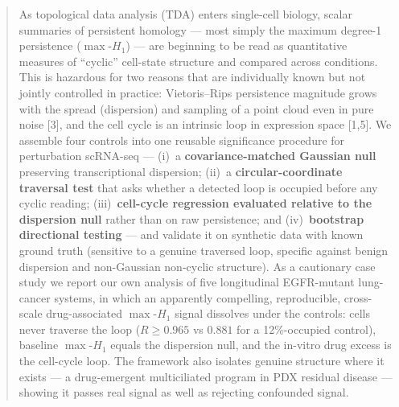 \documentclass[11pt,a4paper]{article}
\newcommand{\maxh}{\ensuremath{\max\text{-}H_1}}
\begin{document}
\begin{abstract}
\noindent As topological data analysis (TDA) enters single-cell biology, scalar summaries of
persistent homology --- most simply the maximum degree-1 persistence (\maxh) --- are beginning to
be read as quantitative measures of ``cyclic'' cell-state structure and compared across conditions.
This is hazardous for two reasons that are individually known but not jointly controlled in
practice: Vietoris--Rips persistence magnitude grows with the spread (dispersion) and sampling of a
point cloud even in pure noise [3], and the cell cycle is an intrinsic loop in expression space
[1,5]. We assemble four controls into one reusable significance procedure for perturbation
scRNA-seq --- (i)~a \textbf{covariance-matched Gaussian null} preserving transcriptional
dispersion; (ii)~a \textbf{circular-coordinate traversal test} that asks whether a detected loop is
occupied before any cyclic reading; (iii)~\textbf{cell-cycle regression evaluated relative to the
dispersion null} rather than on raw persistence; and (iv)~\textbf{bootstrap directional testing}
--- and validate it on synthetic data with known ground truth (sensitive to a genuine traversed
loop, specific against benign dispersion and non-Gaussian non-cyclic structure). As a cautionary
case study we report our own analysis of five longitudinal EGFR-mutant lung-cancer systems, in
which an apparently compelling, reproducible, cross-scale drug-associated \maxh{} signal dissolves
under the controls: cells never traverse the loop ($R \ge 0.965$ vs $0.881$ for a 12\%-occupied
control), baseline \maxh{} equals the dispersion null, and the in-vitro drug excess is the
cell-cycle loop. The framework also isolates genuine structure where it exists --- a drug-emergent
multiciliated program in PDX residual disease --- showing it passes real signal as well as
rejecting confounded signal.
\end{abstract}
\end{document}
